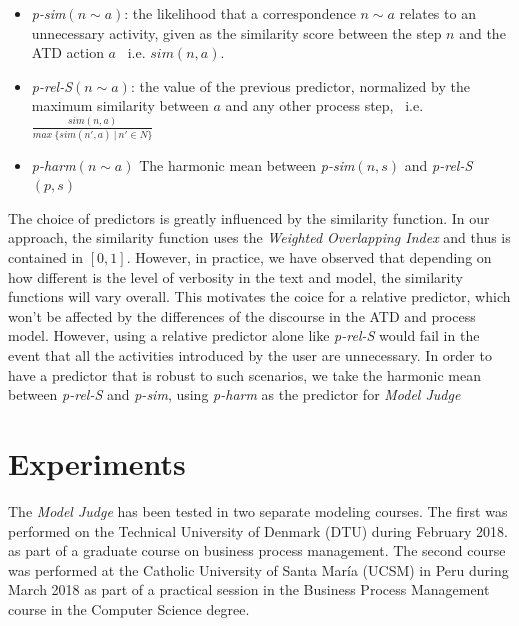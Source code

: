 \begin{itemize}
	\item \textit{p-sim}$(n \sim a)$: the likelihood that a correspondence $n \sim a$
    relates to an unnecessary activity, given as the similarity score between
    the step $n$ and the ATD action $a$~ i.e. $sim(n,a)$.
    
	\item \textit{p-rel-S}$(n \sim a)$: the value of the previous predictor,
    normalized by the maximum similarity between $a$ and any other process step,
    ~i.e. \\ $\frac{sim(n,a)}{max~\{sim(n', a)~|~n' \in N\}}$
    
  \item \textit{p-harm}$(n \sim a)$ The harmonic mean between \textit{p-sim}$(n,
    s)$ and \textit{p-rel-S}$(p,s)$
\end{itemize}


The choice of predictors is greatly influenced by the similarity function. In
our approach, the similarity function uses the \emph{Weighted Overlapping Index}
and thus is contained in $[0,1]$. However, in practice, we have observed that
depending on how different is the level of verbosity in the text and model, the
similarity functions will vary overall. This motivates the coice for a relative
predictor, which won't be affected by the differences of the discourse in the ATD and
process model. However, using a relative predictor alone like \textit{p-rel-S} would
fail in the event that all the activities introduced by the user are
unnecessary. In order to have a predictor that is robust to such scenarios, we
take the harmonic mean between \textit{p-rel-S} and \textit{p-sim}, using
\textit{p-harm} as the predictor for \emph{Model Judge}


 



\section{Experiments}
\label{sec:modeljudge_results}


The \textit{Model Judge} has been tested in two separate modeling courses. The first was performed on the Technical University of Denmark (DTU) during February 2018. as part of a graduate course on business process management. 
The second course was performed at the Catholic University of Santa Mar\'ia (UCSM) in Peru during March 2018 as part of a practical session in the Business Process Management course in the Computer Science degree.

